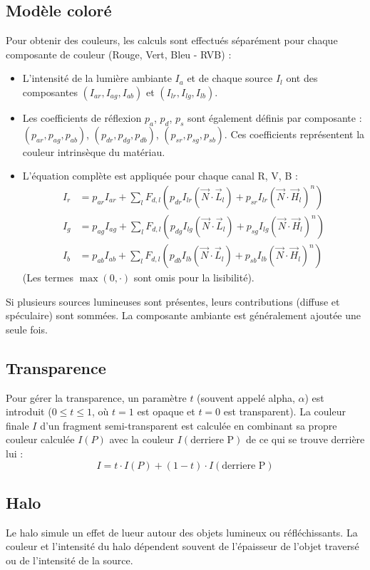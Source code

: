 \documentclass{article}
\begin{document}
\subsection{Modèle coloré}
Pour obtenir des couleurs, les calculs sont effectués séparément pour chaque composante de couleur (Rouge, Vert, Bleu - RVB) :
\begin{itemize}
    \item L'intensité de la lumière ambiante $I_a$ et de chaque source $I_l$ ont des composantes $(I_{ar}, I_{ag}, I_{ab})$ et $(I_{lr}, I_{lg}, I_{lb})$.
    \item Les coefficients de réflexion $p_a$, $p_d$, $p_s$ sont également définis par composante : $(p_{ar}, p_{ag}, p_{ab})$, $(p_{dr}, p_{dg}, p_{db})$, $(p_{sr}, p_{sg}, p_{sb})$. Ces coefficients représentent la couleur intrinsèque du matériau.
    \item L'équation complète est appliquée pour chaque canal R, V, B :
      \begin{align*} I_r &= p_{ar} I_{ar} + \sum_l F_{d,l} (p_{dr} I_{lr} (\vec{N} \cdot \vec{L}_l) + p_{sr} I_{lr} (\vec{N} \cdot \vec{H}_l)^n) \\ I_g &= p_{ag} I_{ag} + \sum_l F_{d,l} (p_{dg} I_{lg} (\vec{N} \cdot \vec{L}_l) + p_{sg} I_{lg} (\vec{N} \cdot \vec{H}_l)^n) \\ I_b &= p_{ab} I_{ab} + \sum_l F_{d,l} (p_{db} I_{lb} (\vec{N} \cdot \vec{L}_l) + p_{sb} I_{lb} (\vec{N} \cdot \vec{H}_l)^n) \end{align*}
      (Les termes $\max(0, \cdot)$ sont omis pour la lisibilité).
\end{itemize}
Si plusieurs sources lumineuses sont présentes, leurs contributions (diffuse et spéculaire) sont sommées. La composante ambiante est généralement ajoutée une seule fois.

\subsection{Transparence}
Pour gérer la transparence, un paramètre $t$ (souvent appelé alpha, $\alpha$) est introduit ($0 \le t \le 1$, où $t=1$ est opaque et $t=0$ est transparent). La couleur finale $I$ d'un fragment semi-transparent est calculée en combinant sa propre couleur calculée $I(P)$ avec la couleur $I(\text{derriere P})$ de ce qui se trouve derrière lui :
\[ I = t \cdot I(P) + (1-t) \cdot I(\text{derriere P}) \]

\subsection{Halo}
Le halo simule un effet de lueur autour des objets lumineux ou réfléchissants. La couleur et l'intensité du halo dépendent souvent de l'épaisseur de l'objet traversé ou de l'intensité de la source.
\end{document}
